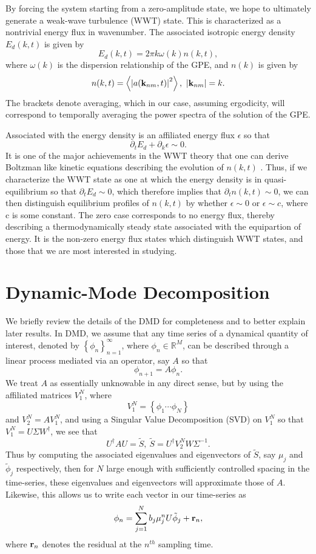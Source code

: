\documentclass[a4paper,11pt]{article}
\newcommand{\pd}{\partial}
\newcommand{\bk}{{\bf k}}
\begin{document}
By forcing the system starting from a zero-amplitude state, we hope to ultimately generate a weak-wave turbulence (WWT) state.  This is characterized as a nontrivial energy flux in wavenumber.  The associated isotropic energy density $E_{d}(k,t)$ is given by 
\[
E_{d}(k,t) = 2\pi k\omega(k)n(k,t), 
\]
where $\omega(k)$ is the dispersion relationship of the GPE, and $n(k)$ is given by 
\[
n(k,t) = \left< \left|a(\bk_{nm},t)\right|^{2}\right>, ~ \left|\bk_{nm}\right| = k.
\]
The brackets denote averaging, which in our case, assuming ergodicity, will correspond to temporally averaging the power spectra of the solution of the GPE.  

Associated with the energy density is an affiliated energy flux $\epsilon$ so that 
\[
\pd_{t} E_{d} + \pd_{k}\epsilon \sim 0.
\]
It is one of the major achievements in the WWT theory that one can derive Boltzman like kinetic equations describing the evolution of $n(k,t)$ \cite{nazarenko}.  Thus, if we characterize the WWT state as one at which the energy density is in quasi-equilibrium so that $\pd_{t}E_{d}\sim 0$, which therefore implies that $\pd_{t}n(k,t)\sim 0$, we can then distinguish equilibrium profiles of $n(k,t)$ by whether $\epsilon \sim 0$ or $\epsilon \sim c$, where c is some constant.  The zero case corresponds to no energy flux, thereby describing a thermodynamically steady state associated with the equipartion of energy.  It is the non-zero energy flux states which distinguish WWT states, and those that we are most interested in studying.  

\section*{Dynamic-Mode Decomposition}
We briefly review the details of the DMD for completeness and to better explain later results.  In DMD, we assume that any time series of a dynamical quantity of interest, denoted by $\left\{\phi_{n}\right\}_{n=1}^{\infty}$, where $\phi_{n}\in \mathbb{R}^{M}$, can be described through a linear process mediated via an operator, say $A$ so that 
\[
\phi_{n+1} = A \phi_{n}.  
\] 
We treat $A$ as essentially unknowable in any direct sense, but by using the affiliated matrices $V_{1}^{N}$, where
\[
V^{N}_{1} = \left\{\phi_{1} \cdots \phi_{N} \right\}
\]
and $V_{2}^{N} = AV_{1}^{N}$, and using a Singular Value Decomposition (SVD) on $V_{1}^{N}$ so that $V_{1}^{N} = U\Sigma W^{\dagger}$, we see that 
\[
U^{\dagger}AU = \tilde{S}, ~ \tilde{S} = U^{\dagger}V_{2}^{N}W\Sigma^{-1}.
\]
Thus by computing the associated eigenvalues and eigenvectors of $\tilde{S}$, say $\mu_{j}$ and $\tilde{\phi}_{j}$ respectively, then for $N$ large enough with sufficiently controlled spacing in the time-series, these eigenvalues and eigenvectors will approximate those of $A$.  Likewise, this allows us to write each vector in our time-series as 
\[
\phi_{n} = \sum_{j=1}^{N} b_{j}\mu_{j}^{n} U\tilde{\phi}_{j} + {\bf r}_{n},
\]
where ${\bf r}_{n}$ denotes the residual at the $n^{th}$ sampling time. 
\end{document}
